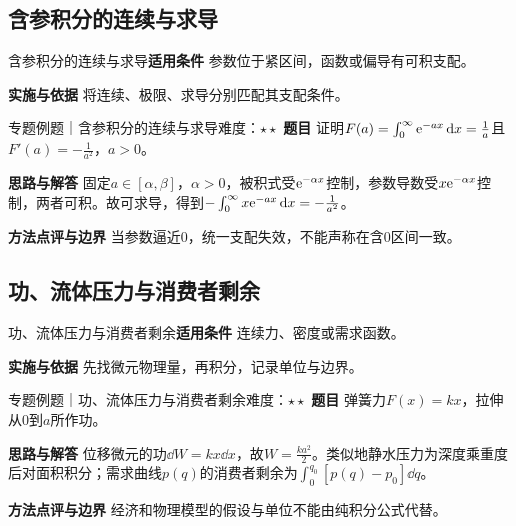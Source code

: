 \subsection{含参积分的连续与求导}\label{mat:integral_analysis:parameter}
\begin{method}{含参积分的连续与求导}\textbf{适用条件} 参数位于紧区间，函数或偏导有可积支配。\par\textbf{实施与依据} 将连续、极限、求导分别匹配其支配条件。\end{method}
\begin{example}{专题例题｜含参积分的连续与求导}{难度：$\star\star$}
\textbf{题目} 证明$F(a)=\int_0^\infty\mathrm{e}^{-ax}\mathop{}\!\mathrm{d} x=\frac{1}{a}$且$F\prime(a)=-\frac{1}{a^2}$，$a>0$。\par\textbf{思路与解答} 固定$a\in[\alpha,\beta]$，$\alpha>0$，被积式受$\mathrm{e}^{-\alpha x}$控制，参数导数受$x\mathrm{e}^{-\alpha x}$控制，两者可积。故可求导，得到$-\int_0^\infty x\mathrm{e}^{-ax}\mathop{}\!\mathrm{d} x=-\frac{1}{a^2}$。\par\textbf{方法点评与边界} 当参数逼近0，统一支配失效，不能声称在含0区间一致。
\end{example}
\subsection{功、流体压力与消费者剩余}\label{mat:integral_analysis:applications}
\begin{method}{功、流体压力与消费者剩余}\textbf{适用条件} 连续力、密度或需求函数。\par\textbf{实施与依据} 先找微元物理量，再积分，记录单位与边界。\end{method}
\begin{example}{专题例题｜功、流体压力与消费者剩余}{难度：$\star\star$}
\textbf{题目} 弹簧力$F(x)=kx$，拉伸从0到$a$所作功。\par\textbf{思路与解答} 位移微元的功$\dd W=kx\dd x$，故$W=\frac{ka^2}{2}$。类似地静水压力为深度乘重度后对面积积分；需求曲线$p(q)$的消费者剩余为$\int_0^{q_0}[p(q)-p_0]\dd q$。\par\textbf{方法点评与边界} 经济和物理模型的假设与单位不能由纯积分公式代替。
\end{example}
